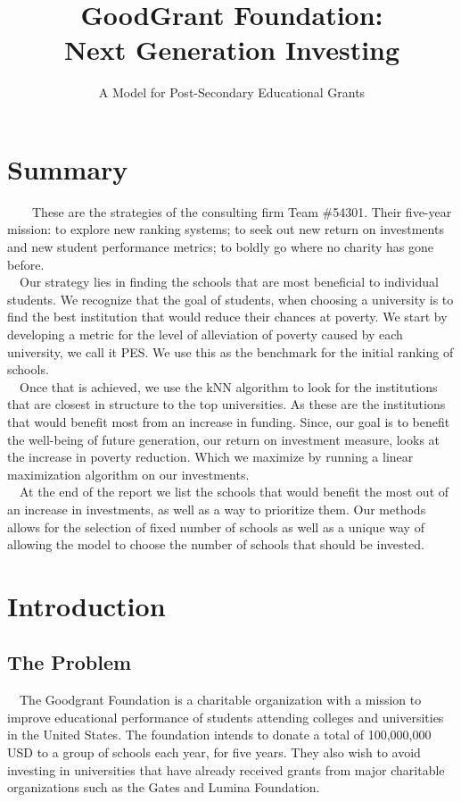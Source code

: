 \documentclass[12pt]{scrartcl}
\title{\vspace{-1.7cm} GoodGrant Foundation: \\Next Generation Investing }
\subtitle{A Model for Post-Secondary Educational Grants\vspace{-1.3cm}}
\begin{document}
\maketitle
\thispagestyle{fancy}

\section*{Summary}
	
	\ \ \ \ These are the strategies of the consulting firm Team \#54301. Their five-year mission: to explore new ranking systems; to seek out new return on investments and new student performance metrics; to boldly go where no charity has gone before.\\
	
	\ \ Our strategy lies in finding the schools that are most beneficial to individual students. We recognize that the goal of students, when choosing a university is to find the best institution that would reduce their chances at poverty. We start by developing a metric for the level of alleviation of poverty caused by each university, we call it PES. We use this as the benchmark for the initial ranking of schools.\\ 

	\ \ Once that is achieved, we use the kNN algorithm to look for the institutions that are closest in structure to the top universities. As these are the institutions that would benefit most from an increase in funding. Since, our goal is to benefit the well-being of future generation, our return on investment measure, looks at the increase in poverty reduction. Which we maximize by running a linear maximization algorithm on our investments.\\

	\ \ At the end of the report we list the schools that would benefit the most out of an increase in investments, as well as a way to prioritize them. Our methods allows for the selection of fixed number of schools as well as a unique way of allowing the model to choose the number of schools that should be invested. 
\newpage
\tableofcontents
\newpage
	

\section{Introduction}
	\subsection{The Problem}
		\ \ The Goodgrant Foundation is a charitable organization with a mission to improve educational performance of students attending colleges and universities in the United States. The foundation intends to donate a total of 100,000,000 USD to a group of schools each year, for five years. They also wish to avoid investing in universities that have already received grants from major charitable organizations such as the Gates and Lumina Foundation.\\
		
\end{document}
